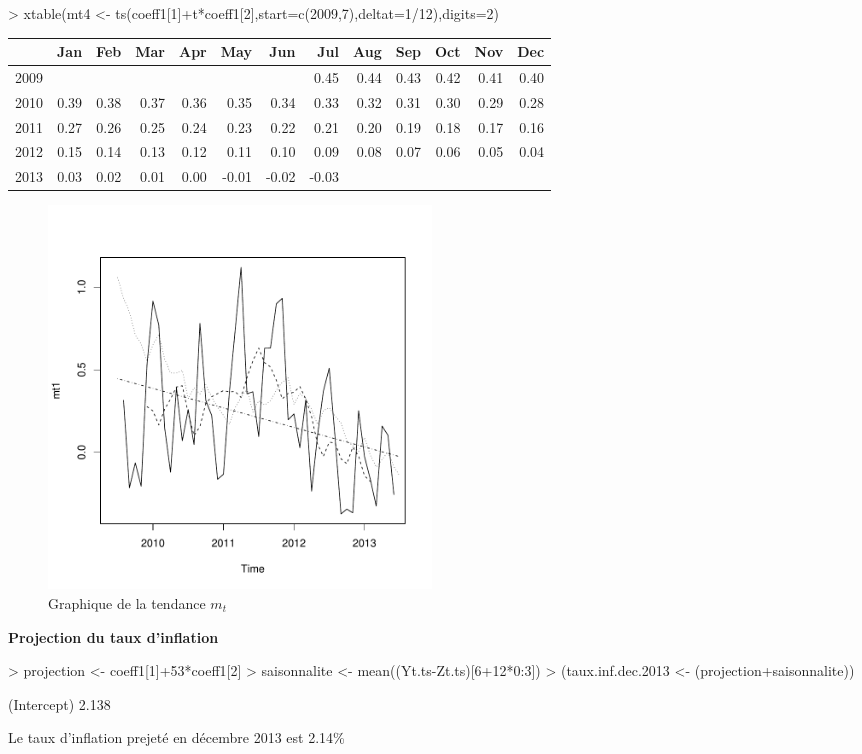 \documentclass{article}
\begin{document}
\begin{Schunk}
\begin{Sinput}
> xtable(mt4 <- ts(coeff1[1]+t*coeff1[2],start=c(2009,7),deltat=1/12),digits=2)
\end{Sinput}
\begin{table}[ht]
\centering
\begin{tabular}{rrrrrrrrrrrrr}
  \hline
 & Jan & Feb & Mar & Apr & May & Jun & Jul & Aug & Sep & Oct & Nov & Dec \\ 
  \hline
2009 &  &  &  &  &  &  & 0.45 & 0.44 & 0.43 & 0.42 & 0.41 & 0.40 \\ 
  2010 & 0.39 & 0.38 & 0.37 & 0.36 & 0.35 & 0.34 & 0.33 & 0.32 & 0.31 & 0.30 & 0.29 & 0.28 \\ 
  2011 & 0.27 & 0.26 & 0.25 & 0.24 & 0.23 & 0.22 & 0.21 & 0.20 & 0.19 & 0.18 & 0.17 & 0.16 \\ 
  2012 & 0.15 & 0.14 & 0.13 & 0.12 & 0.11 & 0.10 & 0.09 & 0.08 & 0.07 & 0.06 & 0.05 & 0.04 \\ 
  2013 & 0.03 & 0.02 & 0.01 & 0.00 & -0.01 & -0.02 & -0.03 &  &  &  &  &  \\ 
   \hline
\end{tabular}
\end{table}\end{Schunk}
\clearpage 
\begin{figure}[p]
  \centering
  \includegraphics[height=4in, width=4in]{exercice1-graph4.pdf}
  \caption{Graphique de la tendance $m_t$}
  \label{fig:exercice1-graph4}
\end{figure}
\clearpage 
\textbf{Projection du taux d'inflation}
\begin{Schunk}
\begin{Sinput}
> projection <- coeff1[1]+53*coeff1[2]
> saisonnalite <- mean((Yt.ts-Zt.ts)[6+12*0:3])
> (taux.inf.dec.2013 <- (projection+saisonnalite))
\end{Sinput}
\begin{Soutput}
(Intercept) 
      2.138 
\end{Soutput}
\end{Schunk}
Le taux d'inflation prejeté en décembre 2013 est 2.14\%\\
\end{document}

